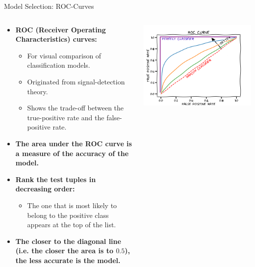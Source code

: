 \begin{frame}{Model Selection: ROC-Curves}
	\begin{columns}
		\begin{column}{0.6\textwidth}
			\begin{itemize}
				\item \textbf{ROC (Receiver Operating Characteristics) curves:}
				      \begin{itemize}
					      \item For visual comparison of classification models.
					      \item Originated from signal-detection theory.
					      \item Shows the trade-off between the true-positive rate and the false-positive rate.
				      \end{itemize}
				\item \textbf{The area under the ROC curve is a {\color{airforceblue}measure of the accuracy} of the model.}
				\item \textbf{{\color{airforceblue}Rank the test tuples} in decreasing order:}
				      \begin{itemize}
					      \item The one that is most likely to belong to the positive class appears at the top of the list.
				      \end{itemize}
				\item \textbf{The closer to the diagonal line (i.e. the closer the area is to $0.5$), the less accurate is the model.}
			\end{itemize}
		\end{column}
		\begin{column}{0.4\textwidth}
			\vspace{-1cm}
			\centering
			\includegraphics[width=\textwidth]{img/roc-curve.png}

\end{column}
\end{columns}
\end{frame}
